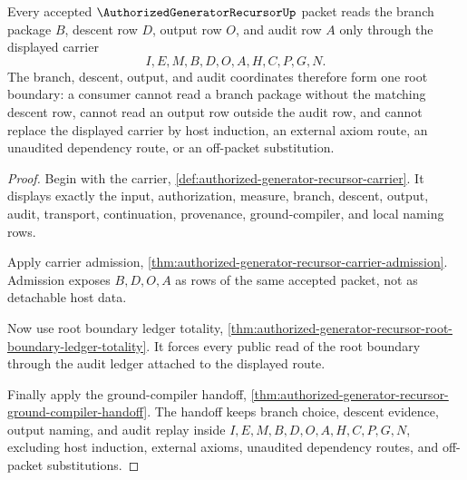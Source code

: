 \begin{theorem}
\label{thm:authorized-generator-recursor-branch-descent-audit-totality}
Every accepted $\AuthorizedGeneratorRecursorUp$ packet reads the branch package $B$, descent row $D$, output row $O$, and audit row $A$ only through the displayed carrier
$$
I,E,M,B,D,O,A,H,C,P,G,N.
$$
The branch, descent, output, and audit coordinates therefore form one root boundary: a consumer cannot read a branch package without the matching descent row, cannot read an output row outside the audit row, and cannot replace the displayed carrier by host induction, an external axiom route, an unaudited dependency route, or an off-packet substitution.
\end{theorem}
\begin{proof}
Begin with the carrier, \autoref{def:authorized-generator-recursor-carrier}. It displays exactly the input, authorization, measure, branch, descent, output, audit, transport, continuation, provenance, ground-compiler, and local naming rows.

Apply carrier admission, \autoref{thm:authorized-generator-recursor-carrier-admission}. Admission exposes $B,D,O,A$ as rows of the same accepted packet, not as detachable host data.

Now use root boundary ledger totality, \autoref{thm:authorized-generator-recursor-root-boundary-ledger-totality}. It forces every public read of the root boundary through the audit ledger attached to the displayed route.

Finally apply the ground-compiler handoff, \autoref{thm:authorized-generator-recursor-ground-compiler-handoff}. The handoff keeps branch choice, descent evidence, output naming, and audit replay inside $I,E,M,B,D,O,A,H,C,P,G,N$, excluding host induction, external axioms, unaudited dependency routes, and off-packet substitutions.
\end{proof}

